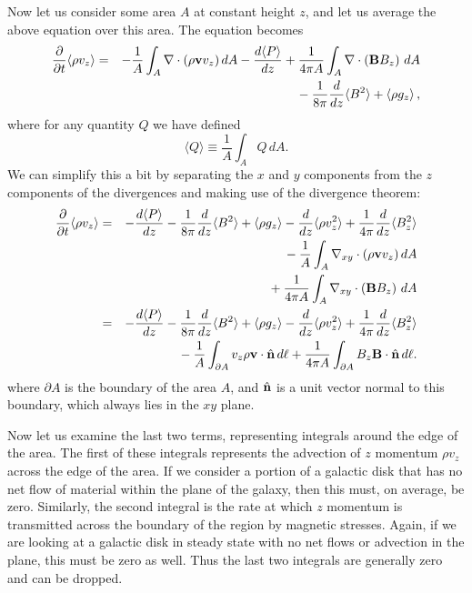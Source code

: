 Now let us consider some area $A$ at constant height $z$, and let us average the above equation over this area. The equation becomes
\begin{eqnarray}
\frac{\partial}{\partial t} \langle \rho v_z\rangle & = & -\frac{1}{A} \int_A \nabla\cdot (\rho\mathbf{v} v_z) \, dA - \frac{d\langle P\rangle}{dz} +
\frac{1}{4\pi A} \int_A \nabla \cdot \left(\mathbf{B} B_z\right)\, dA 
\nonumber \\
& & {} - \frac{1}{8\pi} \frac{d}{dz} \langle B^2 \rangle + \left\langle\rho g_z\right\rangle,
\end{eqnarray}
where for any quantity $Q$ we have defined
\begin{equation}
\langle Q\rangle \equiv \frac{1}{A}\int_A Q\, dA.
\end{equation}
We can simplify this a bit by separating the $x$ and $y$ components from the $z$ components of the divergences and making use of the divergence theorem:
\begin{eqnarray}
\frac{\partial}{\partial t} \langle \rho v_z\rangle & = & - \frac{d\langle P\rangle}{dz} - \frac{1}{8\pi} \frac{d}{dz} \langle B^2 \rangle + \left\langle\rho g_z\right\rangle  - \frac{d}{dz} \langle \rho v_z^2\rangle + \frac{1}{4\pi} \frac{d}{dz} \langle B_z^2\rangle \nonumber \\
& & {}- \frac{1}{A} \int_A \nabla_{xy}\cdot (\rho\mathbf{v} v_z) \, dA
\nonumber \\
& & {}  +
\frac{1}{4\pi A} \int_A \nabla_{xy} \cdot \left(\mathbf{B} B_z\right)\, dA \\
& = & - \frac{d\langle P\rangle}{dz} - \frac{1}{8\pi} \frac{d}{dz} \langle B^2 \rangle + \left\langle\rho g_z\right\rangle  - \frac{d}{dz} \langle \rho v_z^2\rangle + \frac{1}{4\pi} \frac{d}{dz} \langle B_z^2\rangle \nonumber \\
& & {}-\frac{1}{A} \int_{\partial A} v_z \rho \mathbf{v} \cdot \hat{\mathbf{n}} \, d\ell + \frac{1}{4\pi A} \int_{\partial A} B_z \mathbf{B} \cdot \hat{\mathbf{n}} \, d\ell.
\end{eqnarray}
where $\partial A$ is the boundary of the area $A$, and $\hat{\mathbf{n}}$ is a unit vector normal to this boundary, which always lies in the $xy$ plane.

Now let us examine the last two terms, representing integrals around the edge of the area. The first of these integrals represents the advection of $z$ momentum $\rho v_z$ across the edge of the area. If we consider a portion of a galactic disk that has no net flow of material within the plane of the galaxy, then this must, on average, be zero. Similarly, the second integral is the rate at which $z$ momentum is transmitted across the boundary of the region by magnetic stresses. Again, if we are looking at a galactic disk in steady state with no net flows or advection in the plane, this must be zero as well. Thus the last two integrals are generally zero and can be dropped.

